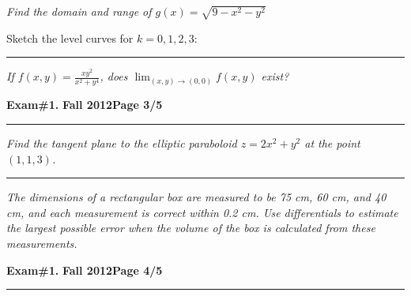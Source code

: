 \documentclass[12pt]{article}
\begin{document}
\bigskip
{\problem[15 pts] \em  Find the domain and range of
$g(x)=\sqrt{9-x^2-y^2}$}
\vspace{2.5cm}
\begin{flushright}
\end{flushright}
Sketch the level curves for $k=0,1,2,3$:
\vspace{8cm}
\hrule
{\problem[15 pts] \em If $f(x,y)=\displaystyle{\frac{xy^2}{x^2+y^4}}$, does
$\displaystyle{\lim_{(x,y)\to(0,0)} f(x,y)}$ exist?
\newpage

\hfill{\large\bf Exam\#1.}\hfill{\large\bf
  Fall 2012}\hfill{\large\bf Page 3/5}\hrule

\bigskip
{\problem[15 pts] \em Find the tangent plane to the elliptic paraboloid
$z=2x^2+y^2$ at the point $(1,1,3)$.}
\vspace{9.5cm}
\begin{flushright}
\end{flushright}
\hrule
{\problem[10 pts] \em The dimensions of a rectangular box are measured
to be 75 cm, 60 cm, and 40 cm, and each measurement is correct within
0.2 cm.  Use differentials to estimate the largest possible error when
the volume of the box is calculated from these measurements.}
\vspace{7.5cm}
\begin{flushright}
\end{flushright}
\newpage

\hfill{\large\bf Exam\#1.}\hfill{\large\bf
  Fall 2012}\hfill{\large\bf Page 4/5}\hrule

}
\end{document}
